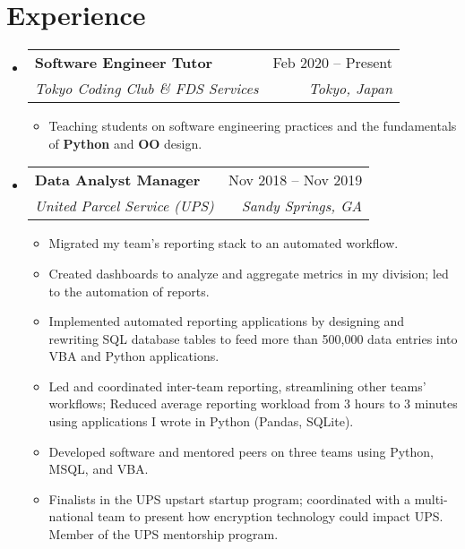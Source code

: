 \documentclass[12pt, letter]{article}
\makeatletter
\newcommand{\resumeItem}[1]{
  \item\small{
    {#1 \vspace{-2pt}}
  }
}
\newcommand{\resumeSubheading}[4]{
  \vspace{-2pt}\item
    \begin{tabular*}{0.97\textwidth}[t]{l@{\extracolsep{\fill}}r}
      \textbf{#1} & #2 \\
      \textit{\small#3} & \textit{\small #4} \\
    \end{tabular*}\vspace{-7pt}
}
\newcommand{\resumeSubHeadingListStart}{\begin{itemize}[leftmargin=0.15in, label={}]}
\newcommand{\resumeSubHeadingListEnd}{\end{itemize}}
\newcommand{\resumeItemListStart}{\begin{itemize}[noitemsep]} %
\newcommand{\resumeItemListEnd}{\end{itemize}\vspace{-16pt}}
\makeatother
\begin{document}


\vspace{-20pt}
\section{Experience}

\resumeSubHeadingListStart
  \resumeSubheading
    {Software Engineer Tutor}{Feb 2020 -- Present}
    {Tokyo Coding Club \& FDS Services}{Tokyo, Japan}
    \resumeItemListStart
      \resumeItem{Teaching students on software engineering practices and the fundamentals of \textbf{Python} and \textbf{OO} design.}
    \resumeItemListEnd
    \resumeSubHeadingListEnd

\resumeSubHeadingListStart
  \resumeSubheading
    {Data Analyst Manager}{Nov 2018 -- Nov 2019}
    {United Parcel Service (UPS)}{Sandy Springs, GA}
    \resumeItemListStart
      \resumeItem{Migrated my team's reporting stack to an automated workflow.}
      \resumeItem{Created dashboards to analyze and aggregate metrics in my division; led to the automation of reports.}
      \resumeItem{Implemented automated reporting applications by designing and rewriting SQL database tables to feed more than 500,000 data entries into VBA and Python applications.}
      \resumeItem{Led and coordinated inter-team reporting, streamlining other teams' workflows; Reduced average reporting workload from 3 hours to 3 minutes using applications I wrote in Python (Pandas, SQLite).}
      \resumeItem{Developed software and mentored peers on three teams using Python, MSQL, and VBA.}
      \resumeItem{Finalists in the UPS upstart startup program; coordinated with a multi-national team to present how encryption technology could impact UPS. Member of the UPS mentorship program.}
    \resumeItemListEnd
    \resumeSubHeadingListEnd
\end{document}
